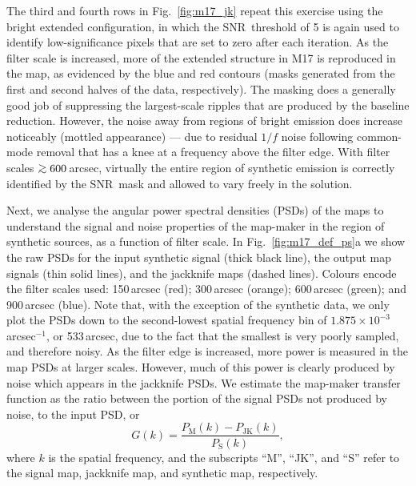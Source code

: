 \documentclass[useAMS,usenatbib,nofootinbib]{mn2e}
\newcommand{\snr}{SNR}
\def\gsim{\mathrel{\lower2.5pt\vbox{\lineskip=0pt\baselineskip=0pt
          \hbox{$>$}\hbox{$\sim$}}}}
\begin{document}
The third and fourth rows in Fig.~\ref{fig:m17_jk} repeat this
exercise using the bright extended configuration, in which the \snr\
threshold of 5 is again used to identify low-significance pixels that
are set to zero after each iteration. As the filter scale is
increased, more of the extended structure in M17 is reproduced in the
map, as evidenced by the blue and red contours (masks generated from
the first and second halves of the data, respectively). The masking
does a generally good job of suppressing the largest-scale ripples
that are produced by the baseline reduction. However, the noise away
from regions of bright emission does increase noticeably (mottled
appearance) --- due to residual $1/f$ noise following common-mode
removal that has a knee at a frequency above the filter edge. With
filter scales $\gsim600$\,arcsec, virtually the entire region of
synthetic emission is correctly identified by the \snr\ mask and
allowed to vary freely in the solution.

Next, we analyse the angular power spectral densities (PSDs) of the
maps to understand the signal and noise properties of the map-maker in
the region of synthetic sources, as a function of filter scale. In
Fig.~\ref{fig:m17_def_ps}a we show the raw PSDs for the input
synthetic signal (thick black line), the output map signals (thin
solid lines), and the jackknife maps (dashed lines). Colours encode
the filter scales used: 150\,arcsec (red); 300\,arcsec (orange);
600\,arcsec (green); and 900\,arcsec (blue). Note that, with the
exception of the synthetic data, we only plot the PSDs down to the
second-lowest spatial frequency bin of
$1.875\times10^{-3}$\,arcsec$^{-1}$, or 533\,arcsec, due to the fact
that the smallest is very poorly sampled, and therefore noisy. As the
filter edge is increased, more power is measured in the map PSDs at
larger scales. However, much of this power is clearly produced by
noise which appears in the jackknife PSDs. We estimate the map-maker
transfer function as the ratio between the portion of the signal PSDs
not produced by noise, to the input PSD, or
%
\begin{equation}
G(k) = \frac{P_\mathrm{M}(k) - P_\mathrm{JK}(k)}{P_\mathrm{S}(k)},
\end{equation}
%
where $k$ is the spatial frequency, and the subscripts ``M'', ``JK'',
and ``S'' refer to the signal map, jackknife map, and synthetic map,
respectively.
\end{document}
